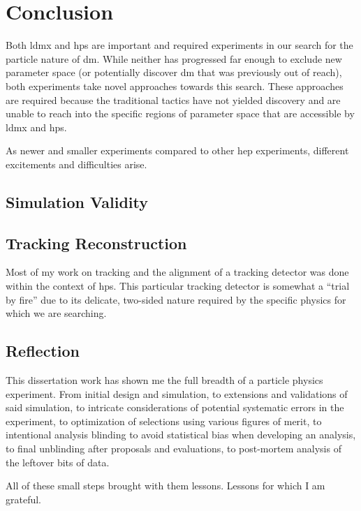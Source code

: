 \chapter{Conclusion}
\label{chapter:conclusion}

Both \ac{ldmx} and \ac{hps} are important and required experiments in our search
for the particle nature of \ac{dm}.
While neither has progressed far enough to exclude new parameter space
(or potentially discover \ac{dm} that was previously out of reach),
both experiments take novel approaches towards this search.
These approaches are required because the traditional tactics have not
yielded discovery and are unable to reach into the specific regions
of parameter space that are accessible by \ac{ldmx} and \ac{hps}.

As newer and smaller experiments compared to other \ac{hep} experiments,
different excitements and difficulties arise.

\section{Simulation Validity}

\section{Tracking Reconstruction}
Most of my work on tracking and the alignment of a tracking detector
was done within the context of \ac{hps}.
This particular tracking detector is somewhat a ``trial by fire'' due
to its delicate, two-sided nature required by the specific physics for
which we are searching.

\section{Reflection}
This dissertation work has shown me the full breadth of a particle physics experiment.
From initial design and simulation, to extensions and validations of said simulation,
to intricate considerations of potential systematic errors in the experiment,
to optimization of selections using various figures of merit,
to intentional analysis blinding to avoid statistical bias when developing an analysis,
to final unblinding after proposals and evaluations,
to post-mortem analysis of the leftover bits of data.

All of these small steps brought with them lessons.
Lessons for which I am grateful.

